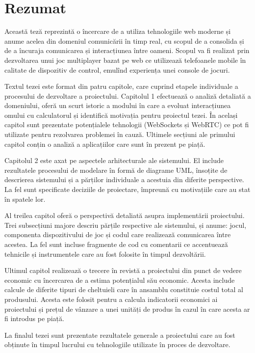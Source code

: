 \section*{Rezumat}


Această teză reprezintă o încercare de a utiliza tehnologiile web moderne și
anume acelea din domeniul comunicării în timp real, cu scopul de a consolida și
de a încuraja comunicarea și interacțiunea între oameni. Scopul va fi realizat
prin dezvoltarea unui joc multiplayer bazat pe web ce utilizează telefoanele
mobile în calitate de dispozitiv de control, emulînd experiența unei
console de jocuri.

Textul tezei este format din patru capitole, care cuprind etapele individuale a
procesului de dezvoltare a proiectului. Capitolul 1 efectuează o analiză
detaliată a domeniului, oferă un scurt istoric a modului în care a evoluat
interacțiunea omului cu calculatorul și identifică motivația pentru proiectul
tezei. În același capitol sunt prezentate potențialele tehnologii (WebSockets și
WebRTC) ce pot fi utilizate pentru rezolvarea problemei în cauză. Ultimele
secțiuni ale primului capitol conțin o analiză a aplicațiilor care sunt în
prezent pe piață.

Capitolul 2 este axat pe aspectele arhitecturale ale sistemului. El include
rezultatele procesului de modelare în formă de diagrame UML, însoțite de
descrierea sistemului și a părților individuale a acestuia din diferite
perspective. La fel sunt specificate deciziile de proiectare, împreună cu
motivațiile care au stat în spatele lor.

Al treilea capitol oferă o perspectivă detaliată asupra implementării
proiectului. Trei subsecțiuni majore descriu părțile respective ale sistemului,
și anume: jocul, componenta dispozitivului de joc și codul care realizează
comunicarea între acestea. La fel sunt incluse fragmente de cod cu comentarii ce
accentuează tehnicile și instrumentele care au fost folosite în timpul
dezvoltării.

Ultimul capitol realizează o trecere în revistă a proiectului din punct de
vedere economic cu încercarea de a estima potențialul său economic. Acesta
include calcule de diferite tipuri de cheltuieli care în ansamblu constituie
costul total al produsului. Acesta este folosit pentru a calcula indicatorii
economici ai proiectului și prețul de vânzare a unei unități de
produs în cazul în care acesta ar fi introdus pe piață.

La finalul tezei sunt prezentate rezultatele generale a proiectului care au fost
obținute în timpul lucrului cu tehnologiile utilizate în proces de dezvoltare.


\clearpage
